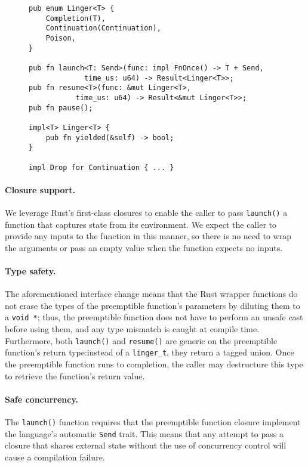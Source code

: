 \begin{figure}
\begin{lstlisting}[label=lst:ingerrustapi,caption=Preemptible functions Rust interface,morekeywords={fn,impl,mut,pub,self,u64,Drop,Result,Send}]
pub enum Linger<T> {
	Completion(T),
	Continuation(Continuation),
	Poison,
}

pub fn launch<T: Send>(func: impl FnOnce() -> T + Send,
			 time_us: u64) -> Result<Linger<T>>;
pub fn resume<T>(func: &mut Linger<T>,
		   time_us: u64) -> Result<&mut Linger<T>>;
pub fn pause();

impl<T> Linger<T> {
	pub fn yielded(&self) -> bool;
}

impl Drop for Continuation { ... }
\end{lstlisting}
\end{figure}

\paragraph{Closure support.}
We leverage Rust's first-class closures to enable the caller to pass
\texttt{launch()} a function that captures state from its environment.  We expect the
caller to provide any inputs to the function in this manner, so there is no need to
wrap the arguments or pass an empty value when the function expects no inputs.


\paragraph{Type safety.}
The aforementioned interface change means that the Rust wrapper functions do not
erase the types of the preemptible function's parameters by diluting them to a
\texttt{void *}; thus, the preemptible function does not have to perform an unsafe
cast before using them, and any type mismatch is caught at compile time.
Furthermore, both \texttt{launch()} and \texttt{resume()} are generic on the
preemptible function's return type:\@ instead of a \texttt{linger\_t}, they return a
tagged union.  Once the preemptible function runs to completion, the caller may
destructure this type to retrieve the function's return value.


\paragraph{Safe concurrency.}
The \texttt{launch()} function requires that the preemptible function closure
implement the language's automatic \texttt{Send} trait.  This means that any attempt
to pass a closure that shares external state without the use of concurrency control
will cause a compilation failure.


